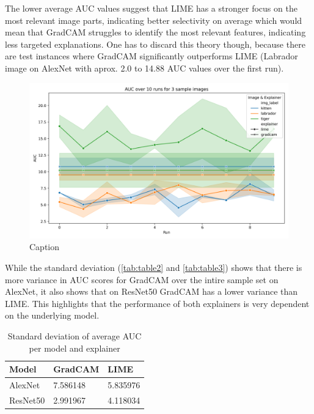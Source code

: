 \documentclass{article}
\begin{document}
%
The lower average AUC values suggest that LIME has a stronger focus on the most relevant image parts, indicating better selectivity on average which would mean that GradCAM struggles to identify the most
relevant features, indicating less targeted explanations. 
One has to discard this theory though, because there are test instances where GradCAM significantly outperforms LIME (Labrador image on AlexNet with aprox. 2.0 to 14.88 AUC values over the first run).

\begin{figure}
    \centering
    \includegraphics[width=.8\linewidth]{results/auc-over10-runs-lineplot.png}
    \caption{Caption}
    \label{fig:auc-over10-runs-lineplot}
\end{figure}

While the standard deviation (\ref{tab:table2} and \ref{tab:table3}) shows that there is more variance in AUC scores for GradCAM over the intire sample set on AlexNet, it also shows that on ResNet50 GradCAM has a lower variance than LIME. This highlights that the performance of both explainers is very dependent on the underlying model.

\begin{table}
    \centering
    \begin{tabular}{lll}
        \hline
        Model       & GradCAM      & LIME \\
        \hline
        AlexNet     & 7.586148    & 5.835976 \\
        ResNet50    & 2.991967    & 4.118034 \\
        \hline
    \end{tabular}
    \caption{Standard deviation of average AUC per model and explainer}
    \label{tab:table1}
\end{table}
\end{document}

